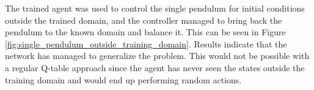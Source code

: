 \documentclass[final]{LTHtwocol} %
\begin{document}
The trained agent was used to control the single pendulum for initial conditions outside the trained domain, and the controller managed to bring back the pendulum to the known domain and balance it.
This can be seen in Figure \ref{fig:single_pendulum_outside_training_domain}.
Results indicate that the network has managed to generalize the problem.
This would not be possible with a regular Q-table approach since the agent has never seen the states outside the training domain and would end up performing random actions.
\end{document}
